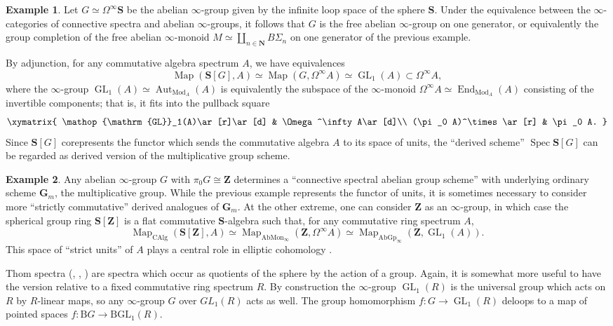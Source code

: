 \documentclass[12pt]{article}
\theoremstyle{definition}
\newtheorem{example}{Example}[subsection]
\newcommand{\GG}{\mathbf{G}}
\newcommand{\NN}{\mathbf{N}}
\renewcommand{\SS}{\mathbf{S}}
\newcommand{\ZZ}{\mathbf{Z}}
\renewcommand{\i}{\infty}
\DeclareMathOperator{\Mod}{Mod}
\DeclareMathOperator{\CAlg}{CAlg}
\DeclareMathOperator{\Aut}{Aut}
\DeclareMathOperator{\End}{End}
\DeclareMathOperator{\Spec}{Spec}
\DeclareMathOperator{\Map}{Map}
\DeclareMathOperator{\GL}{GL}
\begin{document}
\begin{example}
Let $G\simeq\Omega^\infty\SS$ be the abelian $\infty$-group given by the infinite loop space of the sphere $\SS$.
Under the equivalence between the $\infty$-categories of connective spectra and abelian $\i$-groups, it follows that $G$ is the free abelian $\i$-group on one generator, or equivalently the group completion of the free abelian $\i$-monoid $M\simeq\coprod_{n\in\NN} B\Sigma_n$ on one generator of the previous example.

By adjunction, for any commutative algebra spectrum $A$, we have equivalences
\[
\Map(\SS[G],A)\simeq\Map(G,\Omega^\infty A)\simeq\GL_1(A)\subset\Omega^\infty A,
\]
where the $\infty$-group $\GL_1(A)\simeq\Aut_{\Mod_A}(A)$ is equivalently the subspace of the $\infty$-monoid $\Omega^\infty A\simeq\End_{\Mod_A}(A)$ consisting of the invertible components; that is, it fits into the pullback square
\[
\xymatrix{
\GL_1(A)\ar[r]\ar[d] & \Omega^\infty A\ar[d]\\
(\pi_0 A)^\times\ar[r] & \pi_0 A.
}
\]
Since $\SS[G]$ corepresents the functor which sends the commutative algebra $A$ to its space of units, the ``derived scheme'' $\Spec\SS[G]$ can be regarded as derived version of the multiplicative group scheme.
\end{example}

\begin{example}
Any abelian $\i$-group $G$ with $\pi_0 G\cong\ZZ$ determines a ``connective spectral abelian group scheme'' with underlying ordinary scheme $\GG_m$, the multiplicative group.
While the previous example represents the functor of units, it is sometimes necessary to consider more ``strictly commutative'' derived analogues of $\GG_m$. At the other extreme, one can consider $\ZZ$ as an $\i$-group, in which case the spherical group ring $\SS[\ZZ]$ is a flat commutative $\SS$-algebra such that, for any commutative ring spectrum $A$,
\[
\Map_{\CAlg}(\SS[\ZZ],A)\simeq\Map_{\mathrm{AbMon}_\infty}(\ZZ,\Omega^\infty A)\simeq\Map_{\mathrm{AbGp}_\i}(\ZZ,\GL_1(A)).
\]
This space of ``strict units'' of $A$ plays a central role in elliptic cohomology \cite{EC1}.
\end{example}



Thom spectra (\cite{Thom}, \cite{MQRT}, \cite{ABGHR}) are spectra which occur as quotients of the sphere  by the action of a group.
Again, it is somewhat more useful to have the version relative to a fixed  commutative ring spectrum $R$.
By construction the $\i$-group $\GL_1(R)$ is the universal group which acts on $R$ by $R$-linear maps, so any $\i$-group $G$ over $GL_1(R)$ acts as well.
The group homomorphism $f:G\to\GL_1(R)$ deloops to a map of pointed spaces $f:\mathrm{B}G\to \mathrm{BGL}_1(R)$.
\end{document}
